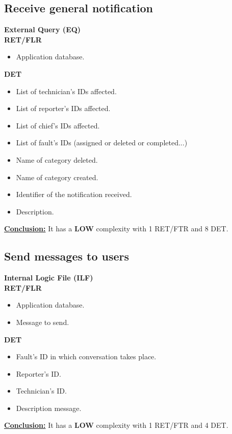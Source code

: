 \subsection{Receive general notification}
\textbf{External Query (EQ)} \\ 
\textbf{RET/FLR}
\begin{itemize}
\item Application database.
\end{itemize}
\textbf{DET}
\begin{itemize}
\item List of technician's IDs affected.
\item List of reporter's IDs affected.
\item List of chief's IDs affected.
\item List of fault's IDs (assigned or deleted or completed...)
\item Name of category deleted.
\item Name of category created.
\item Identifier of the notification received.
\item Description.

\end{itemize}
\textbf{\underline{Conclusion:}} It has a \textbf{LOW} complexity with 1 RET/FTR and 8 DET.

\subsection{Send messages to users}
\textbf{Internal Logic File (ILF)} \\ 
\textbf{RET/FLR}
\begin{itemize}
\item Application database.
\item Message to send.
\end{itemize}
\textbf{DET}
\begin{itemize}
\item Fault's ID in which conversation takes place.
\item Reporter's ID.
\item Technician's ID.
\item Description message.
\end{itemize}
\textbf{\underline{Conclusion:}} It has a \textbf{LOW} complexity with 1 RET/FTR and 4 DET.

